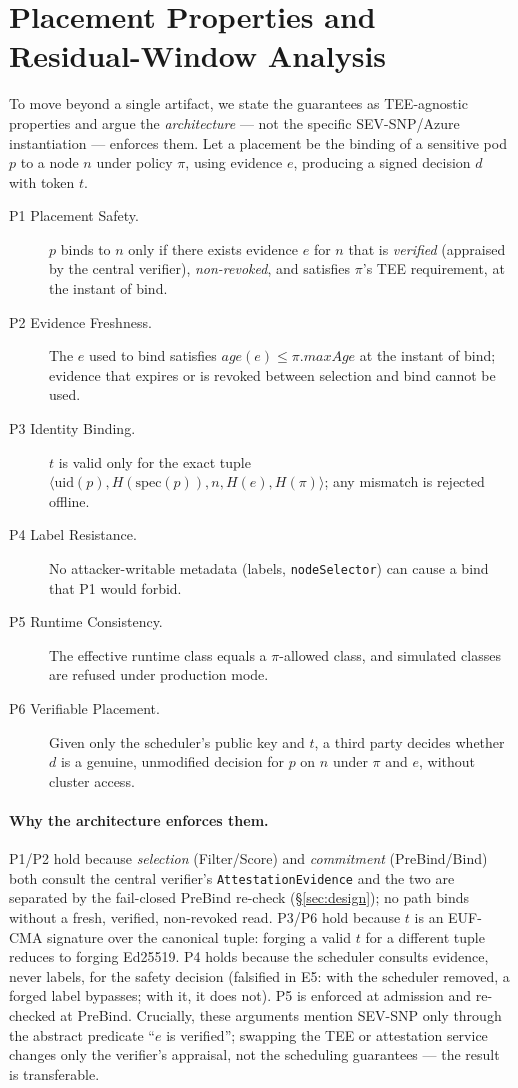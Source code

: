 \section{Placement Properties and Residual-Window Analysis}
\label{sec:properties}

To move beyond a single artifact, we state the guarantees as TEE-agnostic
properties and argue the \emph{architecture} --- not the specific SEV-SNP/Azure
instantiation --- enforces them. Let a placement be the binding of a sensitive
pod $p$ to a node $n$ under policy $\pi$, using evidence $e$, producing a signed
decision $d$ with token $t$.

\begin{description}
  \item[P1 Placement Safety.] $p$ binds to $n$ only if there exists evidence
  $e$ for $n$ that is \emph{verified} (appraised by the central verifier),
  \emph{non-revoked}, and satisfies $\pi$'s TEE requirement, at the instant of
  bind.
  \item[P2 Evidence Freshness.] The $e$ used to bind satisfies
  $\mathit{age}(e) \le \pi.\mathit{maxAge}$ at the instant of bind; evidence that
  expires or is revoked between selection and bind cannot be used.
  \item[P3 Identity Binding.] $t$ is valid only for the exact tuple
  $\langle \mathrm{uid}(p), H(\mathrm{spec}(p)), n, H(e), H(\pi)\rangle$; any
  mismatch is rejected offline.
  \item[P4 Label Resistance.] No attacker-writable metadata (labels,
  \texttt{nodeSelector}) can cause a bind that P1 would forbid.
  \item[P5 Runtime Consistency.] The effective runtime class equals a
  $\pi$-allowed class, and simulated classes are refused under production mode.
  \item[P6 Verifiable Placement.] Given only the scheduler's public key and $t$,
  a third party decides whether $d$ is a genuine, unmodified decision for $p$ on
  $n$ under $\pi$ and $e$, without cluster access.
\end{description}

\paragraph{Why the architecture enforces them.}
P1/P2 hold because \emph{selection} (Filter/Score) and \emph{commitment}
(PreBind/Bind) both consult the central verifier's \texttt{AttestationEvidence}
and the two are separated by the fail-closed PreBind re-check
(\S\ref{sec:design}); no path binds without a fresh, verified, non-revoked read.
P3/P6 hold because $t$ is an EUF-CMA signature over the canonical tuple: forging
a valid $t$ for a different tuple reduces to forging Ed25519. P4 holds because the
scheduler consults evidence, never labels, for the safety decision (falsified in
E5: with the scheduler removed, a forged label bypasses; with it, it does not).
P5 is enforced at admission and re-checked at PreBind. Crucially, these arguments
mention SEV-SNP only through the abstract predicate ``$e$ is verified''; swapping
the TEE or attestation service changes only the verifier's appraisal, not the
scheduling guarantees --- the result is transferable.

